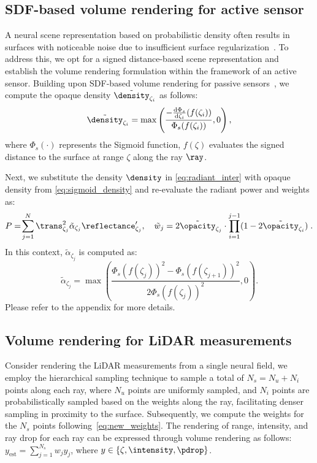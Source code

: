 \subsection{SDF-based volume rendering for active sensor} \label{sec:sdf_vol_render}
A neural scene representation based on probabilistic density often results in surfaces with noticeable noise due to insufficient surface regularization~\cite{wang2021neus}. To address this, we opt for a signed distance-based scene representation and establish the volume rendering formulation within the framework of an active sensor. Building upon SDF-based volume rendering for passive sensors~\cite{wang2021neus}, we compute the opaque density $\tilde{\density}_{\zeta_i}$ as follows:
\begin{equation}
\tilde{\density}_{\zeta_i} = \max\left(\frac{-\frac{{\textrm{d}}\Phi_s}{{\textrm{d}} \zeta_i}(f(\zeta_i))}{\Phi_s(f(\zeta_i))},0\right),
\label{eq:sigmoid_density}
\end{equation}
where $\Phi_s(\cdot)$ represents the Sigmoid function, $f(\zeta)$ evaluates the signed distance to the surface at range $\zeta$ along the ray $\ray$. 

Next, we substitute the density $\density$ in \cref{eq:radiant_inter} with opaque density from \cref{eq:sigmoid_density} and re-evaluate the radiant power and weights as:
\begin{equation}
      P
      =\!\sum_{j=1}^N \trans^2_{\zeta_j} \tilde{\alpha}_{\zeta_j} \reflectance_{\zeta_j}',\quad \tilde{w}_j = 2 \tilde{\opacity}_{\zeta_j} \cdot\prod_{i=1}^{j-1}(1 - 2 \tilde{\opacity}_{\zeta_i})\;.
\end{equation}
In this context, $\tilde{\alpha}_{\zeta_j}$ is computed as:
\begin{equation}
    \tilde{\alpha}_{\zeta_j} = \max\left(\!\frac{{\Phi_s(f(\zeta_j))}^2 -{\Phi_s(f(\zeta_{j+1}))}^2}{{2\Phi_s(f(\zeta_j))}^2},0\right).
    \label{eq:new_weights}
\end{equation}
Please refer to the appendix for more details.


\subsection{Volume rendering for LiDAR measurements}\label{sec:dynamic_nfl_rendering}
Consider rendering the LiDAR measurements from a single neural field, we employ the hierarchical sampling\cite{wang2021neus} technique to sample a total of $N_s= N_u + N_i$ points along each ray, where $N_u$ points are uniformly sampled, and $N_i$ points are probabilistically sampled based on the weights along the ray, facilitating denser sampling in proximity to the surface. Subsequently, we compute the weights for the $N_s$ points following~\cref{eq:new_weights}. The rendering of range, intensity, and ray drop for each ray can be expressed through volume rendering as follows: $y_\text{est} = \sum_{j=1}^{N_s} w_j y_j$, where $y \in \{\zeta, \intensity, \pdrop\}$.


